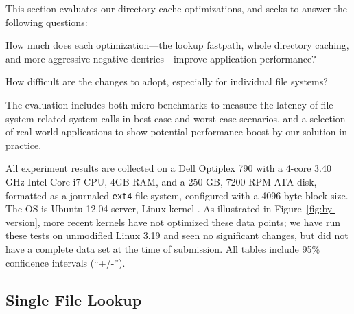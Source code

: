 This section evaluates our directory cache optimizations,
and seeks to answer the following questions:
\begin{compactenum}
\item How much does each optimization---the lookup fastpath, whole directory caching, and more aggressive negative dentries---improve application performance?  
\item How difficult are the changes to adopt, especially for individual file systems?
\end{compactenum}


The evaluation includes both 
micro-benchmarks to measure the latency of file system related system calls in best-case and worst-case scenarios,
and a selection of real-world applications to show potential performance boost by our solution in practice.


All experiment results are collected on a Dell Optiplex 790 with a 4-core 3.40 GHz Intel Core i7 CPU, 4GB RAM, and a 250 GB, 7200 RPM ATA disk,
formatted as a journaled {\tt ext4} file system, configured  with a 4096-byte block size.
The OS is Ubuntu 12.04 server, Linux kernel \linuxver{}. 
As illustrated in Figure~\ref{fig:by-version}, more recent kernels have not optimized these data points; we have run these tests 
on unmodified Linux 3.19 and seen no significant changes, but did not have a complete data set at the time of submission.
All tables include 95\% confidence intervals (``+/-'').


\subsection{Single File Lookup}

